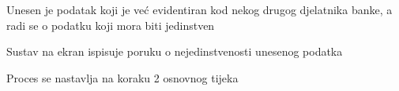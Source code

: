 \begin{packed_item}
\begin{packed_item}
							
							\item[4.b] Unesen je podatak koji je već evidentiran kod nekog drugog djelatnika banke, a radi se o podatku koji mora biti jedinstven
							\begin{packed_enum}
								\item Sustav na ekran ispisuje poruku o nejedinstvenosti unesenog podatka
								\item Proces se nastavlja na koraku 2 osnovnog tijeka
							\end{packed_enum}
							
						\end{packed_item}
						
					\end{packed_item}
					
	
						

